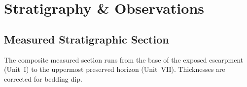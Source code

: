 \section{Stratigraphy \& Observations}

\subsection{Measured Stratigraphic Section}

The composite measured section runs from the base of the exposed escarpment
(Unit~I) to the uppermost preserved horizon (Unit~VII).
Thicknesses are corrected for bedding dip.

\vspace{8pt}

